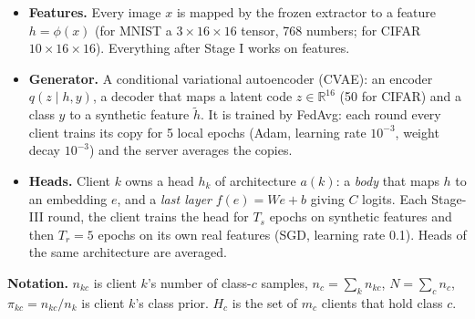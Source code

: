 \documentclass[11pt]{article}
\theoremstyle{plain}
\theoremstyle{definition}
\newcommand{\R}{\mathbb{R}}
\begin{document}
\begin{center}
\end{center}

\begin{itemize}
\item \textbf{Features.} Every image $x$ is mapped by the frozen extractor to a feature $h=\phi(x)$ (for MNIST a
$3\times16\times16$ tensor, 768 numbers; for CIFAR $10\times16\times16$). Everything after Stage I works on features.
\item \textbf{Generator.} A conditional variational autoencoder (CVAE): an encoder $q(z\mid h,y)$, a decoder that maps a
latent code $z\in\R^{16}$ (50 for CIFAR) and a class $y$ to a synthetic feature $\tilde h$. It is trained by FedAvg:
each round every client trains its copy for 5 local epochs (Adam, learning rate $10^{-3}$, weight decay $10^{-3}$) and
the server averages the copies.
\item \textbf{Heads.} Client $k$ owns a head $h_k$ of architecture $a(k)$: a \emph{body} that maps $h$ to an embedding
$e$, and a \emph{last layer} $f(e)=We+b$ giving $C$ logits. Each Stage-III round, the client trains the head for $T_s$
epochs on synthetic features and then $T_r=5$ epochs on its own real features (SGD, learning rate 0.1). Heads of the
same architecture are averaged.
\end{itemize}

\textbf{Notation.} $n_{kc}$ is client $k$'s number of class-$c$ samples, $n_c=\sum_kn_{kc}$, $N=\sum_cn_c$,
$\pi_{kc}=n_{kc}/n_k$ is client $k$'s class prior. $H_c$ is the set of $m_c$ clients that hold class $c$.

\end{document}
